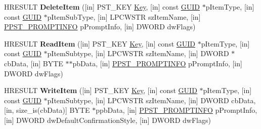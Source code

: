 \begin{DoxyCompactItemize}
\item 
\mbox{\label{interface_p_s_t_o_r_e_c_lib_1_1_i_p_store_acf3946a0aa33611eb603fb8db5a71d5d}} 
H\+R\+E\+S\+U\+LT {\bfseries Delete\+Item} (\mbox{[}in\mbox{]} P\+S\+T\+\_\+\+K\+EY \hyperlink{struct_key}{Key}, \mbox{[}in\mbox{]} const \hyperlink{interface_g_u_i_d}{G\+U\+ID} $\ast$p\+Item\+Type, \mbox{[}in\mbox{]} const \hyperlink{interface_g_u_i_d}{G\+U\+ID} $\ast$p\+Item\+Sub\+Type, \mbox{[}in\mbox{]} L\+P\+C\+W\+S\+TR sz\+Item\+Name, \mbox{[}in\mbox{]} \hyperlink{struct_p_s_t_o_r_e_c_lib_1_1___p_s_t___p_r_o_m_p_t_i_n_f_o}{P\+P\+S\+T\+\_\+\+P\+R\+O\+M\+P\+T\+I\+N\+FO} p\+Prompt\+Info, \mbox{[}in\mbox{]} D\+W\+O\+RD dw\+Flags)
\item 
\mbox{\label{interface_p_s_t_o_r_e_c_lib_1_1_i_p_store_aa3bd3b08a2076b673bae898123eccb8f}} 
H\+R\+E\+S\+U\+LT {\bfseries Read\+Item} (\mbox{[}in\mbox{]} P\+S\+T\+\_\+\+K\+EY \hyperlink{struct_key}{Key}, \mbox{[}in\mbox{]} const \hyperlink{interface_g_u_i_d}{G\+U\+ID} $\ast$p\+Item\+Type, \mbox{[}in\mbox{]} const \hyperlink{interface_g_u_i_d}{G\+U\+ID} $\ast$p\+Item\+Subtype, \mbox{[}in\mbox{]} L\+P\+C\+W\+S\+TR sz\+Item\+Name, \mbox{[}in\mbox{]} D\+W\+O\+RD $\ast$cb\+Data, \mbox{[}in\mbox{]} B\+Y\+TE $\ast$$\ast$pb\+Data, \mbox{[}in\mbox{]} \hyperlink{struct_p_s_t_o_r_e_c_lib_1_1___p_s_t___p_r_o_m_p_t_i_n_f_o}{P\+P\+S\+T\+\_\+\+P\+R\+O\+M\+P\+T\+I\+N\+FO} p\+Prompt\+Info, \mbox{[}in\mbox{]} D\+W\+O\+RD dw\+Flags)
\item 
\mbox{\label{interface_p_s_t_o_r_e_c_lib_1_1_i_p_store_a0296a61bad262b159745a0ba48ec78b7}} 
H\+R\+E\+S\+U\+LT {\bfseries Write\+Item} (\mbox{[}in\mbox{]} P\+S\+T\+\_\+\+K\+EY \hyperlink{struct_key}{Key}, \mbox{[}in\mbox{]} const \hyperlink{interface_g_u_i_d}{G\+U\+ID} $\ast$p\+Item\+Type, \mbox{[}in\mbox{]} const \hyperlink{interface_g_u_i_d}{G\+U\+ID} $\ast$p\+Item\+Subtype, \mbox{[}in\mbox{]} L\+P\+C\+W\+S\+TR sz\+Item\+Name, \mbox{[}in\mbox{]} D\+W\+O\+RD cb\+Data, \mbox{[}in, size\+\_\+is(cb\+Data)\mbox{]} B\+Y\+TE $\ast$ppb\+Data, \mbox{[}in\mbox{]} \hyperlink{struct_p_s_t_o_r_e_c_lib_1_1___p_s_t___p_r_o_m_p_t_i_n_f_o}{P\+P\+S\+T\+\_\+\+P\+R\+O\+M\+P\+T\+I\+N\+FO} p\+Prompt\+Info, \mbox{[}in\mbox{]} D\+W\+O\+RD dw\+Default\+Confirmation\+Style, \mbox{[}in\mbox{]} D\+W\+O\+RD dw\+Flags)
\item 
$$
\end{DoxyCompactItemize}

